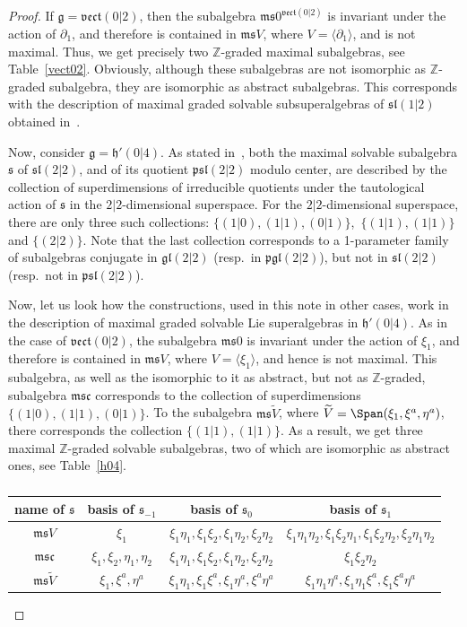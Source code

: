 \documentclass[10pt,a4paper]{amsart}
\newcommand {\Zee} {{\mathbb Z}}
\newcommand {\fc} {{\mathfrak{c}}}
\newcommand {\fg} {{\mathfrak{g}}} %
\newcommand {\fgl} {{\mathfrak{gl}}} %
\newcommand {\fh} {{\mathfrak{h}}}
\newcommand {\fm} {{\mathfrak{m}}}
\newcommand {\fp} {{\mathfrak{p}}} %
\newcommand {\fs} {{\mathfrak{s}}}
\newcommand {\fsl} {{\mathfrak{sl}}}
\newcommand {\fvect} {{\mathfrak{vect}}} %
\newcommand {\<} [2] {{\left.\vphantom{#2}\right.^{#1\!}\!{#2}}}
\numberwithin{equation}{section}
\begin{document}
\begin{proof} If $\fg=\fvect(0|2)$, then the subalgebra $\fm\fs 0^{\fvect(0|2)}$ is invariant under the action of $\partial_1$, and therefore is contained in $\fm\fs V$, where $V=\langle \partial_1\rangle$, and is not maximal. Thus, we get precisely two $\Zee$-graded maximal subalgebras, see Table~\ref{vect02}. Obviously, although these subalgebras are not isomorphic as $\Zee$-graded subalgebra, they are isomorphic as abstract subalgebras. This corresponds with the description of maximal graded solvable subsuperalgebras of $\fsl(1|2)$ obtained in~\cite{S2}.

Now, consider $\fg=\fh'(0|4)$. As stated in~\cite{S2}, both the maximal solvable subalgebra $\fs$ of $\fsl(2|2)$, and of its quotient $\fp\fsl(2|2)$ modulo center, are described by the collection of superdimensions of irreducible quotients under the tautological action of $\fs$ in the $2|2$-dimensional superspace. For the $2|2$-dimensional superspace, there are only three such collections: $\{(1|0), (1|1), (0|1)\}$,\, $\{(1|1), (1|1)\}$ and $\{(2|2)\}$. Note that the last collection corresponds to a 1-parameter family of subalgebras conjugate in $\fgl(2|2)$ (resp.\ in $\fp\fgl(2|2)$), but not in $\fsl(2|2)$ (resp.\ not in $\fp\fsl(2|2)$).

Now, let us look how the constructions, used in this note in other cases, work in the description of maximal graded solvable Lie superalgebras in $\fh'(0|4)$. As in the case of $\fvect(0|2)$, the subalgebra $\fm\fs 0$ is invariant under the action of $\xi_1$, and therefore is contained in $\fm\fs V$, where $V=\langle \xi_1\rangle$, and hence is not maximal. This subalgebra, as well as the isomorphic to it as abstract, but not as $\Zee$-graded, subalgebra $\fm\fs\fc$ corresponds to the collection of superdimensions $\{(1|0), (1|1), (0|1)\}$. To the subalgebra $\fm\fs\widetilde V$, where $\widetilde V=\Span(\xi_1,\xi^a,\eta^a)$, there corresponds the collection $\{(1|1), (1|1)\}$. As a result, we get three maximal $\Zee$-graded solvable subalgebras, two of which are isomorphic as abstract ones, see Table~\ref{h04}.
\begin{table}[h]\centering\renewcommand{\arraystretch}{1.2}
\begin{tabular}{|c|c|c|c|}
\hline
name of $\fs$ & basis of $\fs_{-1}$ & basis of $\fs_0$ & basis of $\fs_1$\\
\hline
$\fm\fs V$ & $\xi_1 $ & $\xi_1\eta_1, \xi_1\xi_2, \xi_1\eta_2, \xi_2\eta_2$ & $\xi_1\eta_1\eta_2, \xi_1\xi_2\eta_1, \xi_1\xi_2\eta_2, \xi_2\eta_1\eta_2$ \\
\hline
$\fm\fs\fc$ & $\xi_1, \xi_2,\eta_1,\eta_2 $ & $\xi_1\eta_1, \xi_1\xi_2, \xi_1\eta_2, \xi_2\eta_2$ & $\xi_1\xi_2\eta_2$ \\
\hline
$\fm\fs\widetilde V$ & $\xi_1, \xi^a, \eta^a$ & $\xi_1\eta_1, \xi_1\xi^a, \xi_1\eta^a, \xi^a\eta^a$ & $\xi_1\eta_1\eta^a, \xi_1\eta_1\xi^a, \xi_1\xi^a\eta^a$ \\
\hline
\end{tabular}
\caption{}\label{ill}
\end{table}


\end{proof}
\end{document}
